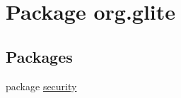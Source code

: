\hypertarget{namespaceorg_1_1glite}{
\section{Package org.glite}
\label{namespaceorg_1_1glite}
}
\subsection*{Packages}
\begin{DoxyCompactItemize}
\item 
package \hyperlink{namespaceorg_1_1glite_1_1security}{security}
\end{DoxyCompactItemize}
